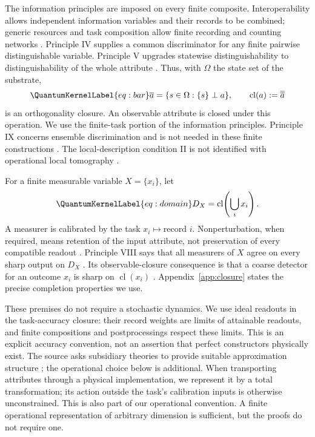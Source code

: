 \documentclass[a4paper,11pt,twocolumn,unpublished]{quantumarticle}
\let\label\QuantumKernelLabel
\DeclareMathOperator{\cl}{cl}
\newcommand{\ddbar}[1]{\overline{\overline{#1}}}
\begin{document}
The information principles are imposed on every finite composite. Interoperability allows independent information variables and their records to be combined; generic resources and task composition allow finite recording and counting networks \cite[Sec.~6, III, VI, VII, pp.~12--14]{cti}. Principle IV supplies a common discriminator for any finite pairwise distinguishable variable. Principle V upgrades statewise distinguishability to distinguishability of the whole attribute \cite[Sec.~6, p.~13]{cti}. Thus, with $\Omega$ the state set of the substrate,
\begin{equation}\label{eq:bar}
 \overline a=\{s\in\Omega:\{s\}\perp a\},\qquad \cl(a):=\ddbar a
\end{equation}
is an orthogonality closure. An observable attribute is closed under this operation. We use the finite-task portion of the information principles. Principle IX concerns ensemble discrimination and is not needed in these finite constructions \cite[Sec.~6, p.~19]{cti}. The local-description condition II is not identified with operational local tomography \cite[Sec.~2, p.~12]{ctp}.

For a finite measurable variable $X=\{x_i\}$, let
\begin{equation}\label{eq:domain}
 D_X=\cl\!\left(\bigcup_i x_i\right).
\end{equation}
A measurer is calibrated by the task $x_i\mapsto\text{record }i$. Nonperturbation, when required, means retention of the input attribute, not preservation of every compatible readout \cite[Sec.~5, Eqs.~(4)--(5), pp.~11--12]{cti}. Principle VIII says that all measurers of $X$ agree on every sharp output on $D_X$ \cite[Sec.~6, p.~16]{cti}. Its observable-closure consequence is that a coarse detector for an outcome $x_i$ is sharp on $\cl(x_i)$ \cite[Sec.~6, pp.~16--18]{cti}. Appendix~\ref{app:closure} states the precise completion properties we use.

These premises do not require a stochastic dynamics. We use ideal readouts in the task-accuracy closure: their record weights are limits of attainable readouts, and finite compositions and postprocessings respect these limits. This is an explicit accuracy convention, not an assertion that perfect constructors physically exist. The source asks subsidiary theories to provide suitable approximation structure \cite[Sec.~2, principle I, p.~12]{ctp}; the operational choice below is additional. When transporting attributes through a physical implementation, we represent it by a total transformation; its action outside the task's calibration inputs is otherwise unconstrained. This is also part of our operational convention. A finite operational representation of arbitrary dimension is sufficient, but the proofs do not require one.
\end{document}
